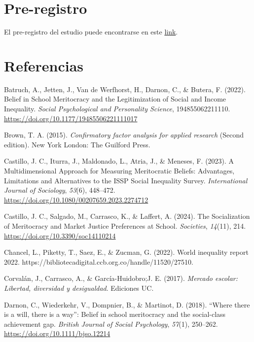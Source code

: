 \documentclass[
  12pt,
  letterpaper,
]{article}
\newlength{\cslhangindent}
\newenvironment{CSLReferences}[2] %
 {\begin{list}{}{%
  \setlength{\itemindent}{0pt}
  \setlength{\leftmargin}{0pt}
  \setlength{\parsep}{0pt}
  \ifodd #1
   \setlength{\leftmargin}{\cslhangindent}
   \setlength{\itemindent}{-1\cslhangindent}
  \fi
  \setlength{\itemsep}{#2\baselineskip}}}
 {\end{list}}
\begin{document}
\section{Pre-registro}\label{pre-registro}

El pre-registro del estudio puede encontrarse en este
\href{https://osf.io/2uhrk}{link}.

\section{Referencias}\label{referencias}

\label{refs}
\begin{CSLReferences}{1}{0}
Batruch, A., Jetten, J., Van de Werfhorst, H., Darnon, C., \& Butera, F.
(2022). Belief in {School Meritocracy} and the {Legitimization} of
{Social} and {Income Inequality}. \emph{Social Psychological and
Personality Science}, 194855062211110.
\url{https://doi.org/10.1177/19485506221111017}

Brown, T. A. (2015). \emph{Confirmatory factor analysis for applied
research} (Second edition). New York London: The Guilford Press.

Castillo, J. C., Iturra, J., Maldonado, L., Atria, J., \& Meneses, F.
(2023). A {Multidimensional Approach} for {Measuring Meritocratic
Beliefs}: {Advantages}, {Limitations} and {Alternatives} to the {ISSP
Social Inequality Survey}. \emph{International Journal of Sociology},
\emph{53}(6), 448--472.
\url{https://doi.org/10.1080/00207659.2023.2274712}

Castillo, J. C., Salgado, M., Carrasco, K., \& Laffert, A. (2024). The
{Socialization} of {Meritocracy} and {Market Justice Preferences} at
{School}. \emph{Societies}, \emph{14}(11), 214.
\url{https://doi.org/10.3390/soc14110214}

Chancel, L., Piketty, T., Saez, E., \& Zucman, G. (2022). World
inequality report 2022.
https://bibliotecadigital.ccb.org.co/handle/11520/27510.

Corvalán, J., Carrasco, A., \& García-Huidobro;J. E. (2017).
\emph{Mercado escolar: {Libertad}, diversidad y desigualdad}. Ediciones
UC.

Darnon, C., Wiederkehr, V., Dompnier, B., \& Martinot, D. (2018).
{``{Where} there is a will, there is a way''}: {Belief} in school
meritocracy and the social-class achievement gap. \emph{British Journal
of Social Psychology}, \emph{57}(1), 250--262.
\url{https://doi.org/10.1111/bjso.12214}


\end{CSLReferences}
\end{document}
